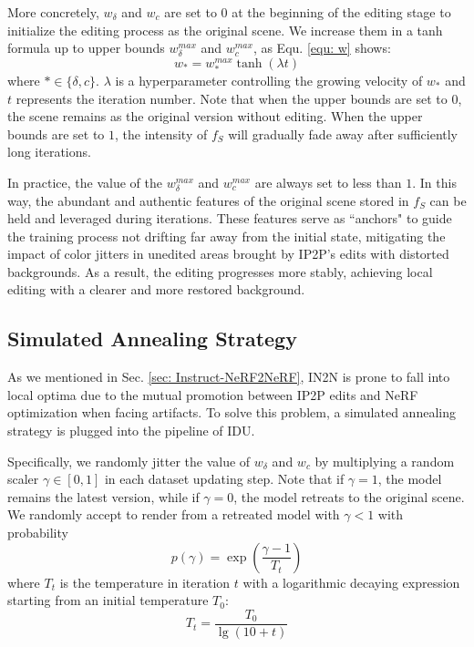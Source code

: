 More concretely, $w_{\delta}$ and $w_{c}$ are set to $0$ at the beginning of the editing stage to initialize the editing process as the original scene. We increase them in a tanh formula up to upper bounds $w_{\delta}^{max}$ and $w_{c}^{max}$, as Equ. \ref{equ: w} shows:
\begin{equation}
    w_{*} = w_{*}^{max}\tanh(\lambda t)
    \label{equ: w}
\end{equation}
where $* \in \{\delta, c\}$. $\lambda$ is a hyperparameter controlling the growing velocity of $w_*$ and $t$ represents the iteration number. Note that when the upper bounds are set to $0$, the scene remains as the original version without editing. When the upper bounds are set to $1$, the intensity of $f_S$ will gradually fade away after sufficiently long iterations.

In practice, the value of the $w_{\delta}^{max}$ and $w_{c}^{max}$ are always set to less than $1$. In this way, the abundant and authentic features of the original scene stored in $f_S$ can be held and leveraged during iterations. These features serve as ``anchors" to guide the training process not drifting far away from the initial state, mitigating the impact of color jitters in unedited areas brought by IP2P's edits with distorted backgrounds. As a result, the editing progresses more stably, achieving local editing with a clearer and more restored background.

\subsection{Simulated Annealing Strategy}
\label{sec: Simulated Annealing Strategy}
As we mentioned in Sec. \ref{sec: Instruct-NeRF2NeRF}, IN2N is prone to fall into local optima due to the mutual promotion between IP2P edits and NeRF optimization when facing artifacts. To solve this problem, a simulated annealing strategy is plugged into the pipeline of IDU.

Specifically, we randomly jitter the value of $w_{\delta}$ and $w_c$ by multiplying a random scaler $\gamma \in [0, 1]$ in each dataset updating step. Note that if $\gamma = 1$, the model remains the latest version, while if $\gamma = 0$, the model retreats to the original scene. We randomly accept to render from a retreated model with $\gamma < 1$ with probability
\begin{equation}
    p(\gamma) = \exp(\frac{\gamma - 1}{T_t})
\end{equation}
where $T_t$ is the temperature in iteration $t$ with a logarithmic decaying expression starting from an initial temperature $T_0$:
\begin{equation}
    T_t = \frac{T_0}{\lg(10 + t)}
\end{equation}

